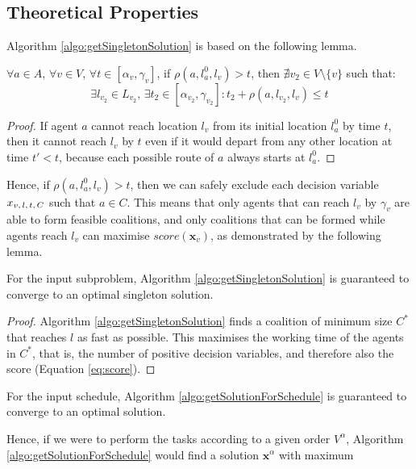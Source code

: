 \subsection{Theoretical Properties}\label{sec:ant-properties}

Algorithm \ref{algo:getSingletonSolution} is based on the following lemma.
\begin{lemma}\label{lemma:1}
$\forall a \in A$, $\forall v \in V$, $\forall t \in [\alpha_v, \gamma_v]$, if $\rho(a,
l_a^0, l_v) > t$, then $\nexists v_2 \in V \setminus \{ v \}$ such that:
\begin{equation}
    \exists l_{v_2} \in L_{v_2},\, \exists t_2 \in [\alpha_{v_2},
    \gamma_{v_2}] : t_2 + \rho(a, l_{v_2}, l_v) \leq t
\end{equation}
\end{lemma}
\begin{proof}
If agent $a$ cannot reach location $l_v$ from its initial location $l_a^0$ by time
$t$, then it cannot reach $l_v$ by $t$ even if it would depart from any other location
at time $t' < t$, because each possible route of $a$ always starts at $l_a^0$.
\end{proof}
Hence, if $\rho(a, l_a^0, l_v) > t$, then we can safely exclude each decision variable
$x_{v,\, l,\, t,\, C}$ such that $a \in C$. This means that only agents that can reach $l_v$ by $\gamma_v$
are able to form feasible coalitions, and only coalitions that can be formed while agents
reach $l_v$ can maximise $score(\bm{x}_v)$, as demonstrated by the following lemma.
\begin{lemma}\label{lemma:2}
    For the input subproblem, Algorithm \ref{algo:getSingletonSolution} is guaranteed to
    converge to an optimal singleton solution.
\end{lemma}
\begin{proof}
Algorithm \ref{algo:getSingletonSolution} finds a coalition of minimum size $C^\ast$ that
reaches $l$ as fast as possible. This maximises the working time of the agents in
$C^\ast$, that is, the number of positive decision variables, and therefore also the score
(Equation \ref{eq:score}).
\end{proof}
\begin{corollary}\label{cor:1}
    For the input schedule, Algorithm \ref{algo:getSolutionForSchedule} is guaranteed to
    converge to an optimal solution.
\end{corollary}
Hence, if we were to perform the tasks according to a given order $V^\alpha$, Algorithm
\ref{algo:getSolutionForSchedule} would find a solution $\bm{x}^\alpha$ with maximum
